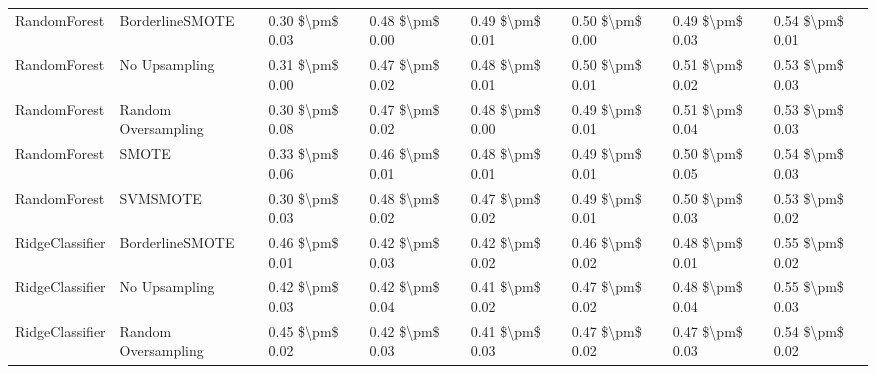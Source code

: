 \begin{tabular}{llllllll}
                   RandomForest &               BorderlineSMOTE & 0.30 \$\textbackslash pm\$ 0.03 &           0.48 \$\textbackslash pm\$ 0.00 &       0.49 \$\textbackslash pm\$ 0.01 &        0.50 \$\textbackslash pm\$ 0.00 &                         0.49 \$\textbackslash pm\$ 0.03 &     0.54 \$\textbackslash pm\$ 0.01 \\
                   RandomForest &                 No Upsampling & 0.31 \$\textbackslash pm\$ 0.00 &           0.47 \$\textbackslash pm\$ 0.02 &       0.48 \$\textbackslash pm\$ 0.01 &        0.50 \$\textbackslash pm\$ 0.01 &                         0.51 \$\textbackslash pm\$ 0.02 &     0.53 \$\textbackslash pm\$ 0.03 \\
                   RandomForest &           Random Oversampling & 0.30 \$\textbackslash pm\$ 0.08 &           0.47 \$\textbackslash pm\$ 0.02 &       0.48 \$\textbackslash pm\$ 0.00 &        0.49 \$\textbackslash pm\$ 0.01 &                         0.51 \$\textbackslash pm\$ 0.04 &     0.53 \$\textbackslash pm\$ 0.03 \\
                   RandomForest &                         SMOTE & 0.33 \$\textbackslash pm\$ 0.06 &           0.46 \$\textbackslash pm\$ 0.01 &       0.48 \$\textbackslash pm\$ 0.01 &        0.49 \$\textbackslash pm\$ 0.01 &                         0.50 \$\textbackslash pm\$ 0.05 &     0.54 \$\textbackslash pm\$ 0.03 \\
                   RandomForest &                      SVMSMOTE & 0.30 \$\textbackslash pm\$ 0.03 &           0.48 \$\textbackslash pm\$ 0.02 &       0.47 \$\textbackslash pm\$ 0.02 &        0.49 \$\textbackslash pm\$ 0.01 &                         0.50 \$\textbackslash pm\$ 0.03 &     0.53 \$\textbackslash pm\$ 0.02 \\
                RidgeClassifier &               BorderlineSMOTE & 0.46 \$\textbackslash pm\$ 0.01 &           0.42 \$\textbackslash pm\$ 0.03 &       0.42 \$\textbackslash pm\$ 0.02 &        0.46 \$\textbackslash pm\$ 0.02 &                         0.48 \$\textbackslash pm\$ 0.01 &     0.55 \$\textbackslash pm\$ 0.02 \\
                RidgeClassifier &                 No Upsampling & 0.42 \$\textbackslash pm\$ 0.03 &           0.42 \$\textbackslash pm\$ 0.04 &       0.41 \$\textbackslash pm\$ 0.02 &        0.47 \$\textbackslash pm\$ 0.02 &                         0.48 \$\textbackslash pm\$ 0.04 &     0.55 \$\textbackslash pm\$ 0.03 \\
                RidgeClassifier &           Random Oversampling & 0.45 \$\textbackslash pm\$ 0.02 &           0.42 \$\textbackslash pm\$ 0.03 &       0.41 \$\textbackslash pm\$ 0.03 &        0.47 \$\textbackslash pm\$ 0.02 &                         0.47 \$\textbackslash pm\$ 0.03 &     0.54 \$\textbackslash pm\$ 0.02 \\

\end{tabular}
